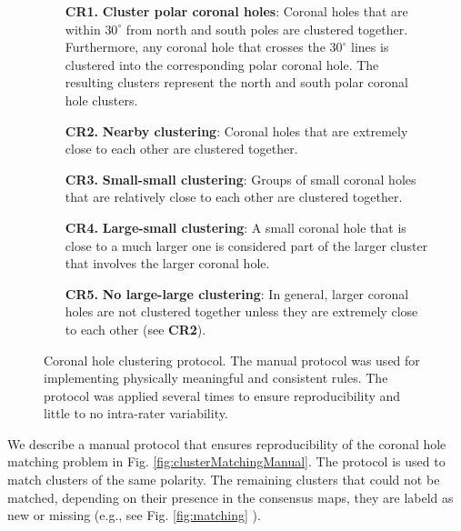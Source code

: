 \documentclass[journal]{IEEEtran}
\begin{document}
\begin{figure}[!t]
        \begin{itemize}
                \item[{\bf CR1.}] \textbf{Cluster polar coronal holes}:
                   Coronal holes that are within $30^{\circ}$ from north and south poles are clustered together.
                   Furthermore, any coronal hole that crosses the $30^{\circ}$ lines is clustered into
                       the corresponding polar coronal hole.
                       The resulting clusters represent the north and south polar coronal hole clusters.
                \item[{\bf CR2.}] \textbf{Nearby clustering}: Coronal holes that are extremely close to each other
                are clustered together.
                \item[{\bf CR3.}] \textbf{Small-small clustering}: 
                Groups of small coronal holes that are relatively close to each other are
                clustered together.
                \item[{\bf CR4.}] \textbf{Large-small clustering}:
                A small coronal hole that is close to a much larger one is considered
                part of the larger cluster that involves the larger coronal hole.
                \item[{\bf CR5.}] \textbf{No large-large clustering}:
                In general, larger coronal holes are not clustered together
                unless they are extremely close to each other (see \textbf{CR2}).
        \end{itemize}
        \caption{Coronal hole clustering protocol. The manual protocol was
            used for implementing physically meaningful and consistent rules.
        The protocol was applied several times to
        ensure reproducibility and little to no intra-rater variability.}
    \label{fig:holeClusterManual}
\end{figure}


We describe a manual protocol that ensures reproducibility
    of the coronal hole matching problem in
    Fig.  \ref{fig:clusterMatchingManual}.
The protocol is used to match clusters of the same polarity.
The remaining clusters that could not be matched,
     depending on their presence in the consensus maps,
     they are labeld as new or missing
     (e.g., see  Fig. \ref{fig:matching} ).
     
\end{document}
